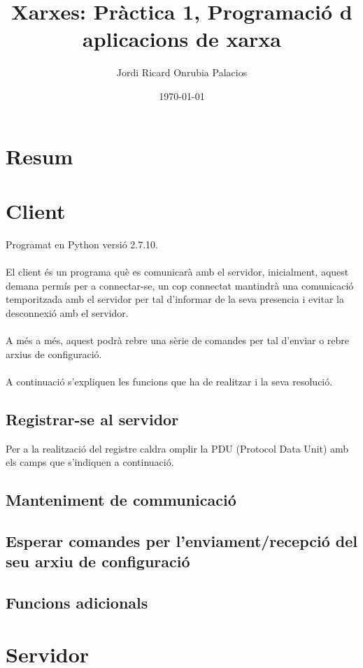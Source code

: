 \documentclass[11pt]{article}
\begin{document}
\title{Xarxes: Pràctica 1, Programaci\'{o} d\textsc{} aplicacions de xarxa}
\author{Jordi Ricard Onrubia Palacios}
\date{\today}
\maketitle
\newpage
\section*{Resum}
\justify
\newpage
\tableofcontents
\newpage
\section{Client}
\justify
Programat en Python versió 2.7.10.
\\\\
El client és un programa què es comunicarà amb el servidor, inicialment, aquest demana permís per a connectar-se, un cop connectat mantindrà una comunicació temporitzada amb el servidor per tal d'informar de la seva presencia i evitar la desconnexió amb el servidor.
\\\\
A més a més, aquest podrà rebre una sèrie de comandes per tal d'enviar o rebre arxius de configuració.
\\\\
A continuació s'expliquen les funcions que ha de realitzar i la seva resolució.

	\subsection{Registrar-se al servidor}
Per a la realització del registre caldra omplir la PDU (Protocol Data Unit) amb els camps que s'indiquen a continuació.



	\subsection{Manteniment de communicació}
	\subsection{Esperar comandes per l'enviament/recepció del seu arxiu de configuració}
	\subsection{Funcions adicionals}
	
\section{Servidor}
\end{document}
